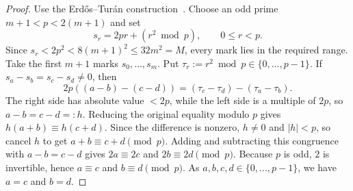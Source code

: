 \documentclass[11pt]{article}
\theoremstyle{definition}
\theoremstyle{remark}
\begin{document}
\begin{proof}
Use the Erd\H{o}s--Tur\'an construction~\cite{erdos-turan}. Choose an odd prime $m+1<p<2(m+1)$ and set
\[
s_r=2pr+(r^2\bmod p),\qquad 0\le r<p.
\]
Since $s_r<2p^2<8(m+1)^2\le32m^2=M$, every mark lies in the required range. Take the first $m+1$ marks $s_0,\ldots,s_m$. Put $\tau_r:=r^2\bmod p\in\{0,\ldots,p-1\}$. If
$s_a-s_b=s_c-s_d\ne0$, then
\[
2p((a-b)-(c-d))=(\tau_c-\tau_d)-(\tau_a-\tau_b).
\]
The right side has absolute value $<2p$, while the left side is a multiple of $2p$, so $a-b=c-d=:h$. Reducing the original equality modulo
$p$ gives $h(a+b)\equiv h(c+d)$. Since the difference is nonzero, $h\ne0$ and $|h|<p$, so cancel $h$ to get $a+b\equiv c+d\pmod p$. Adding
and subtracting this congruence with $a-b=c-d$ gives $2a\equiv2c$ and $2b\equiv2d\pmod p$. Because $p$ is odd, $2$ is invertible, hence
$a\equiv c$ and $b\equiv d\pmod p$. As $a,b,c,d\in\{0,\ldots,p-1\}$, we have $a=c$ and $b=d$.
\end{proof}
\end{document}
